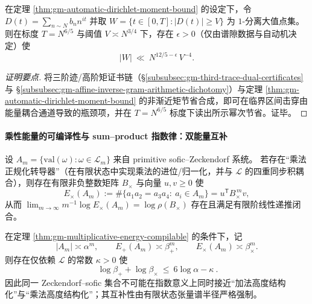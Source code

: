 \begin{corollary}\label{cor:gm-critical-window-automatic-saving}
在定理 \ref{thm:gm-automatic-dirichlet-moment-bound} 的设定下，令
\(
D(t)=\sum_{n\sim N} b_n n^{it}
\)
并取 \(W=\{t\in[0,T]:|D(t)|\ge V\}\) 为 \(1\)-分离大值点集。
则在标度 \(T=N^{6/5}\) 与阈值 \(V\asymp N^{3/4}\) 下，存在 \(\epsilon>0\)（仅由谱隙数据与自动机决定）使
\[
|W|\ \ll\ N^{12/5-\epsilon}\,V^{-4}.
\]
\end{corollary}

\begin{proof}[证明要点]
将三阶迹/高阶矩证书链（\S\ref{subsubsec:gm-third-trace-dual-certificates} 与 \S\ref{subsubsec:gm-affine-inverse-gram-arithmetic-dichotomy}）与定理 \ref{thm:gm-automatic-dirichlet-moment-bound} 的非渐近矩节省合成，即可在临界区间击穿由能量耦合通道导致的瓶颈项，并在 \(T=N^{6/5}\) 标度下读出所示幂次节省。证毕。
\end{proof}

\paragraph{乘性能量的可编译性与 sum--product 指数律：双能量互补}
\begin{theorem}\label{thm:gm-multiplicative-energy-compilable}
设 \(A_m=\{\mathrm{val}(\omega):\omega\in\mathcal{L}_m\}\) 来自 primitive sofic--Zeckendorf 系统。
若存在“乘法正规化转导器”（在有限状态中实现乘法的进位/归一化，并与 \(\mathcal{L}\) 的四重同步积耦合），则存在有限非负整数矩阵 \(B_{\times}\) 与向量 \(u,v\ge 0\) 使
\[
E_{\times}(A_m):=\#\{a_1a_2=a_3a_4:\ a_i\in A_m\}
=u^{\mathsf T}B_{\times}^{\,m}v,
\]
从而 \(\lim_{m\to\infty}m^{-1}\log E_\times(A_m)=\log\rho(B_\times)\) 存在且满足有限阶线性递推闭合。
\end{theorem}

\begin{theorem}\label{thm:gm-add-mult-energy-complementarity}
在定理 \ref{thm:gm-multiplicative-energy-compilable} 的条件下，记
\[
|A_m|\asymp \alpha^m,\qquad
E_+(A_m)\asymp \beta_+^m,\qquad
E_\times(A_m)\asymp \beta_\times^m.
\]
则存在仅依赖 \(\mathcal{L}\) 的常数 \(\kappa>0\) 使
\[
\boxed{\ \log\beta_+ + \log\beta_\times\ \le\ 6\log\alpha-\kappa\ }.
\]
因此同一 Zeckendorf--sofic 集合不可能在指数意义上同时接近“加法高度结构化”与“乘法高度结构化”；其互补性由有限状态张量谱半径严格强制。
\end{theorem}

